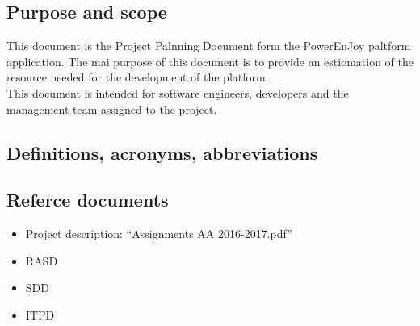 \subsection{Purpose and scope}
This document is the Project Palnning Document form the PowerEnJoy paltform application. The mai purpose of this document is to provide an estiomation of the resource needed for the development of the platform.\\
This document is intended for software engineers, developers and the management team assigned to the project.\\

\subsection{Definitions, acronyms, abbreviations}

\subsection{Referce documents}
\begin{itemize}
		\item Project description: “Assignments AA 2016-2017.pdf”
	 	\item RASD
	 	\item SDD
	 	\item ITPD
\end{itemize}
